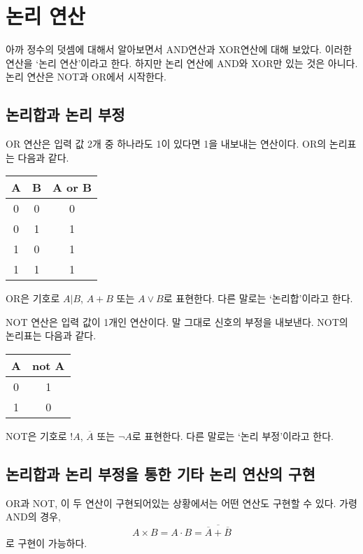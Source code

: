 \documentclass{article}
\begin{document}
\section{논리 연산}

아까 정수의 덧셈에 대해서 알아보면서 AND연산과 XOR연산에 대해 보았다. 이러한 연산을 `논리
연산'이라고 한다. 하지만 논리 연산에 AND와 XOR만 있는 것은 아니다. 논리 연산은 NOT과 OR에서
시작한다.

\subsection{논리합과 논리 부정}

OR 연산은 입력 값 2개 중 하나라도 1이 있다면 1을 내보내는 연산이다. OR의 논리표는 다음과 같다.

\begin{center}
    \begin{tabular}{cc|c}
        A & B & A or B \\
        \hline
        0 & 0 & 0 \\
        0 & 1 & 1 \\
        1 & 0 & 1 \\
        1 & 1 & 1
    \end{tabular}
\end{center}

OR은 기호로 $A | B$, $A + B$ 또는 $A \vee B$로 표현한다. 다른 말로는 `논리합'이라고 한다.

NOT 연산은 입력 값이 1개인 연산이다. 말 그대로 신호의 부정을 내보낸다.
NOT의 논리표는 다음과 같다.

\begin{center}
    \begin{tabular}{c|c}
        A & not A \\
        \hline
        0 & 1 \\
        1 & 0
    \end{tabular}
\end{center}

NOT은 기호로 $!A$, $\overline A$ 또는 $\neg A$로 표현한다. 다른 말로는 `논리 부정'이라고 한다.

\subsection{논리합과 논리 부정을 통한 기타 논리 연산의 구현}

OR과 NOT, 이 두 연산이 구현되어있는 상황에서는 어떤 연산도 구현할 수 있다. 가령 AND의 경우,
$$A \times B = A \cdot B = \overline{\overline A + \overline B}$$
로 구현이 가능하다.
\end{document}
